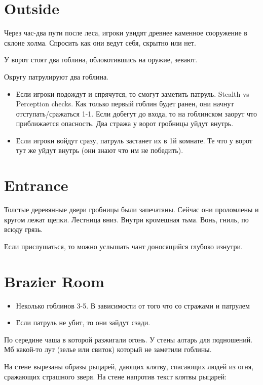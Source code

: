 \documentclass[a4paper,11pt]{book}
\begin{document}
\begin{multicols}{2}
\section{Outside}
Через час-два пути после леса, игроки увидят древнее каменное сооружение в склоне холма. Спросить как они ведут себя, скрытно или нет.

У ворот стоят два гоблина, облокотившись на оружие, зевают.

Округу патрулируют два гоблина.
\begin{itemize}
  \item Если игроки подождут и спрячутся, то смогут заметить патруль. Stealth vs Perception checks. Как только первый гоблин будет ранен, они начнут отступать/сражаться 1-1. Если добегут до входа, то на гоблинском заорут что приближается опасность. Два стража у ворот гробницы уйдут внутрь.
  \item Если игроки войдут сразу, патруль застанет их в 1й комнате. Те что у ворот тут же уйдут внутрь (они знают что им не победить).
\end{itemize}

\section{Entrance}

Толстые деревянные двери гробницы были запечатаны. Сейчас они проломлены и кругом лежат щепки. Лестница вниз. Внутри кромешная тьма. Вонь, гниль, по всюду грязь.

Если прислушаться, то можно услышать чант доносящийся глубоко изнутри.

\section{Brazier Room}

\begin{itemize}
  \item Неколько гоблинов 3-5. В зависимости от того что со стражами и патрулем
  \item Если патруль не убит, то они зайдут сзади.
\end{itemize}

По середине чаша в которой разжигали огонь. У стены алтарь для подношений. Мб какой-то лут (зелье или свиток) который не заметили гоблины.

На стене вырезаны образы рыцарей, дающих клятву, спасающих людей из огня, сражающих страшного зверя. На стене напротив текст клятвы рыцарей:


\end{multicols}
\end{document}
